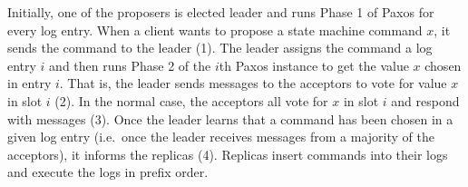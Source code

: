 {}

Initially, one of the proposers is elected leader and runs Phase 1 of Paxos for
every log entry. When a client wants to propose a state machine command
$x$, it sends the command to the leader (1). The leader assigns the command a
log entry $i$ and then runs Phase 2 of the $i$th Paxos instance to get the
value $x$ chosen in entry $i$. That is, the leader sends 
messages to the acceptors to vote for value $x$ in slot $i$ (2). In the normal
case, the acceptors all vote for $x$ in slot $i$ and respond with
 messages (3). Once the leader learns that a command has
been chosen in a given log entry (i.e.\ once the leader receives
 messages from a majority of the acceptors), it informs the
replicas (4). Replicas insert commands into their logs and execute the logs in
prefix order.
